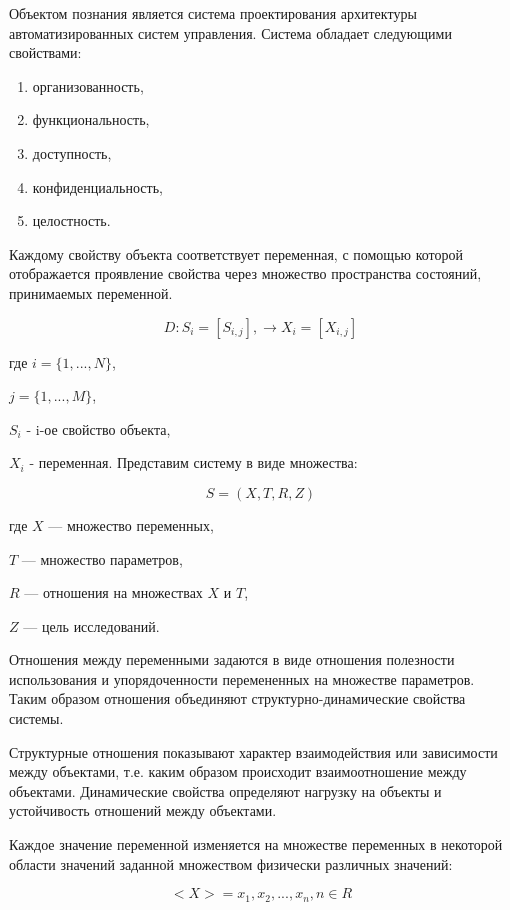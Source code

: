 Объектом познания является система проектирования архитектуры автоматизированных систем управления. Система обладает следующими свойствами:
\begin{enumerate}
    \item  организованность,
    \item  функциональность,
    \item  доступность,
    \item  конфиденциальность,
    \item  целостность.
\end{enumerate}

Каждому свойству объекта соответствует переменная, с помощью которой отображается проявление свойства через множество пространства состояний, принимаемых переменной.  

\begin{equation}
    \label{eq:equation1}
    D: S_i = [S_{i,j}], \rightarrow X_i = [X_{i,j}]
\end{equation}

где $i = \{1,...,N\}$, 

$j = \{1,...,M\}$,

$S_i$ - i-ое свойство объекта,

$X_i$ - переменная.
Представим систему в виде множества:

\begin{equation}
    \label{eq:equation2}
    S = (X,T,R,Z)
\end{equation}

где $X$ — множество переменных, 

$T$ — множество параметров, 

$R$ — отношения на множествах $X$ и $T$, 

$Z$ — цель исследований.

Отношения между переменными задаются в виде отношения полезности использования и упорядоченности перемененных на множестве параметров. Таким образом отношения объединяют структурно-динамические свойства системы.

Структурные отношения показывают характер взаимодействия или зависимости между объектами, т.е. каким образом происходит взаимоотношение между объектами. Динамические свойства определяют нагрузку на объекты и устойчивость отношений между объектами.

Каждое значение переменной изменяется на множестве переменных в некоторой области значений заданной множеством физически различных значений:

\begin{equation}
    \label{eq:equation3}
    <X> = {x_1, x_2, ..., x_n}, n \in {R}  
\end{equation}

